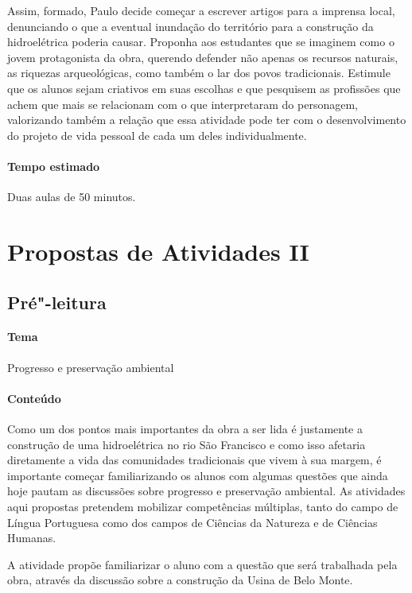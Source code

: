 \documentclass[12pt]{extarticle}
\begin{document}
Assim, formado, Paulo decide começar a escrever artigos para a
imprensa local, denunciando o que a eventual inundação do território
para a construção da hidroelétrica poderia causar. Proponha aos
estudantes que se imaginem como o jovem protagonista da obra, querendo
defender não apenas os recursos naturais, as riquezas arqueológicas,
como também o lar dos povos tradicionais. Estimule que os alunos sejam
criativos em suas escolhas e que pesquisem as profissões que achem que
mais se relacionam com o que interpretaram do personagem, valorizando
também a relação que essa atividade pode ter com o desenvolvimento do
projeto de vida pessoal de cada um deles individualmente.



\paragraph{Tempo estimado} Duas aulas de 50 minutos.

\section{Propostas de Atividades II}

\subsection{Pré"-leitura}

\paragraph{Tema} Progresso e preservação ambiental


\paragraph{Conteúdo}
Como um dos pontos mais importantes da obra a ser lida é justamente a
construção de uma hidroelétrica no rio São Francisco e como isso
afetaria diretamente a vida das comunidades tradicionais que vivem à
sua margem, é importante começar familiarizando os alunos com algumas
questões que ainda hoje pautam as discussões sobre progresso e
preservação ambiental. As atividades aqui propostas pretendem
mobilizar competências múltiplas, tanto do campo de Língua Portuguesa
como dos campos de Ciências da Natureza e de Ciências Humanas.

A atividade propõe familiarizar o aluno com a questão que será
trabalhada pela obra, através da discussão sobre a construção da Usina
de Belo Monte.
\end{document}
